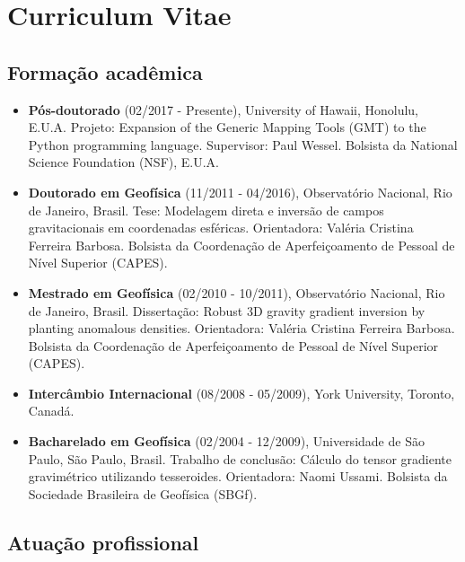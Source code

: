 \section{Curriculum Vitae}


\subsection{Formação acadêmica}

\begin{itemize}
    \item \textbf{Pós-doutorado} (02/2017 - Presente),
        University of Hawaii, Honolulu, E.U.A.
        Projeto: Expansion of the Generic Mapping Tools (GMT) to the Python
        programming language.
        Supervisor: Paul Wessel.
        Bolsista da National Science Foundation (NSF), E.U.A.
    \item \textbf{Doutorado em Geofísica} (11/2011 - 04/2016),
        Observatório Nacional, Rio de Janeiro, Brasil.
        Tese: Modelagem direta e inversão de campos gravitacionais em
        coordenadas esféricas.
        Orientadora: Valéria Cristina Ferreira Barbosa.
        Bolsista da Coordenação de Aperfeiçoamento de Pessoal de Nível
        Superior (CAPES).
    \item \textbf{Mestrado em Geofísica} (02/2010 - 10/2011),
        Observatório Nacional, Rio de Janeiro, Brasil.
        Dissertação: Robust 3D gravity gradient inversion by planting anomalous
        densities.
        Orientadora: Valéria Cristina Ferreira Barbosa.
        Bolsista da Coordenação de Aperfeiçoamento de Pessoal de Nível
        Superior (CAPES).
    \item \textbf{Intercâmbio Internacional} (08/2008 - 05/2009),
        York University, Toronto, Canadá.
    \item \textbf{Bacharelado em Geofísica} (02/2004 - 12/2009),
        Universidade de São Paulo, São Paulo, Brasil.
        Trabalho de conclusão: Cálculo do tensor gradiente gravimétrico
        utilizando tesseroides.
        Orientadora: Naomi Ussami.
        Bolsista da Sociedade Brasileira de Geofísica (SBGf).
\end{itemize}


\subsection{Atuação profissional}

